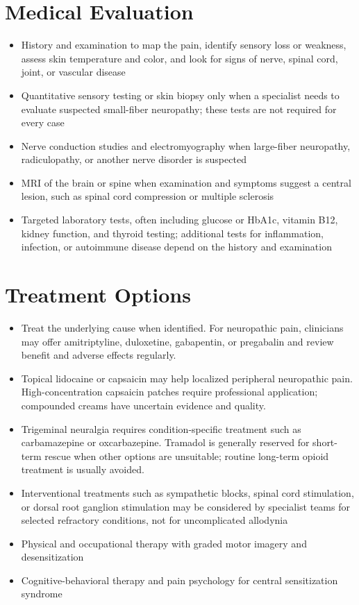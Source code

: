 \section*{Medical Evaluation}
\begin{itemize}
 \item History and examination to map the pain, identify sensory loss or weakness, assess skin temperature and color, and look for signs of nerve, spinal cord, joint, or vascular disease
 \item Quantitative sensory testing or skin biopsy only when a specialist needs to evaluate suspected small-fiber neuropathy; these tests are not required for every case
 \item Nerve conduction studies and electromyography when large-fiber neuropathy, radiculopathy, or another nerve disorder is suspected
 \item MRI of the brain or spine when examination and symptoms suggest a central lesion, such as spinal cord compression or multiple sclerosis
 \item Targeted laboratory tests, often including glucose or HbA1c, vitamin B12, kidney function, and thyroid testing; additional tests for inflammation, infection, or autoimmune disease depend on the history and examination
\end{itemize}

\section*{Treatment Options}
\begin{itemize}
 \item Treat the underlying cause when identified. For neuropathic pain, clinicians may offer amitriptyline, duloxetine, gabapentin, or pregabalin and review benefit and adverse effects regularly.
 \item Topical lidocaine or capsaicin may help localized peripheral neuropathic pain. High-concentration capsaicin patches require professional application; compounded creams have uncertain evidence and quality.
 \item Trigeminal neuralgia requires condition-specific treatment such as carbamazepine or oxcarbazepine. Tramadol is generally reserved for short-term rescue when other options are unsuitable; routine long-term opioid treatment is usually avoided.
 \item Interventional treatments such as sympathetic blocks, spinal cord stimulation, or dorsal root ganglion stimulation may be considered by specialist teams for selected refractory conditions, not for uncomplicated allodynia
 \item Physical and occupational therapy with graded motor imagery and desensitization
 \item Cognitive-behavioral therapy and pain psychology for central sensitization syndrome
\end{itemize}


